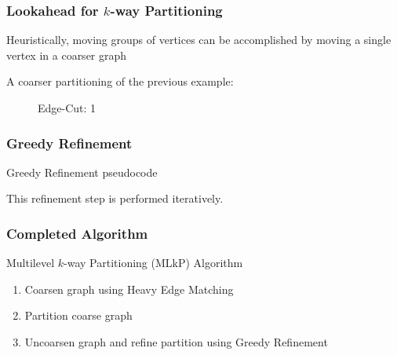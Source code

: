 \documentclass{beamer}
\begin{document}
\begin{frame}[noframenumbering]
  \frametitle{Lookahead for $k$-way Partitioning}

  Heuristically, moving groups of vertices can be accomplished by moving a single vertex in a coarser graph

  A coarser partitioning of the previous example:

  \begin{figure}
    \caption*{Edge-Cut: 1}
  \end{figure}

\end{frame}

\begin{frame}[fragile]
  \frametitle{Greedy Refinement}

  \begin{block}{Greedy Refinement pseudocode}
  \begin{algorithm}[H]
    \begin{algorithmic}[1]
      \ENDFOR
    \end{algorithmic}
  \end{algorithm}
\end{block}

This refinement step is performed iteratively.

\end{frame}

\begin{frame}
  \frametitle{Completed Algorithm}

  \begin{block}{Multilevel $k$-way Partitioning (MLkP) Algorithm}
    \begin{enumerate}
      \item Coarsen graph using Heavy Edge Matching
      \item Partition coarse graph
      \item Uncoarsen graph and refine partition using Greedy Refinement
    \end{enumerate}
  \end{block}

\end{frame}
\end{document}

